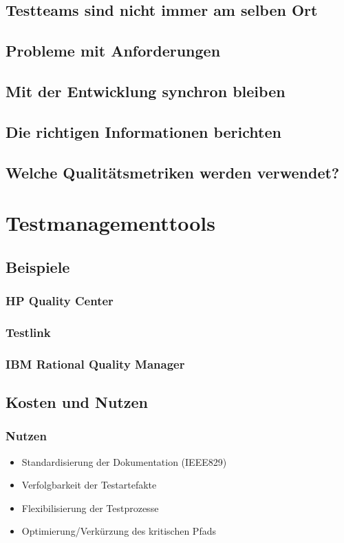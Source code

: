 \section{Testteams sind nicht immer am selben Ort}
\section{Probleme mit Anforderungen}
\section{Mit der Entwicklung synchron bleiben}
\section{Die richtigen Informationen berichten}
\section{Welche Qualit\"atsmetriken werden verwendet?}

\chapter{Testmanagementtools}
\section{Beispiele}
\subsection{HP Quality Center}
\subsection{Testlink}
\subsection{IBM Rational Quality Manager}
\section{Kosten und Nutzen}
\subsection{Nutzen}
\begin{itemize}
	\item Standardisierung der Dokumentation (IEEE829)
	\item Verfolgbarkeit der Testartefakte
	\item Flexibilisierung der Testprozesse
	\item Optimierung/Verkürzung des kritischen Pfads
\end{itemize}
